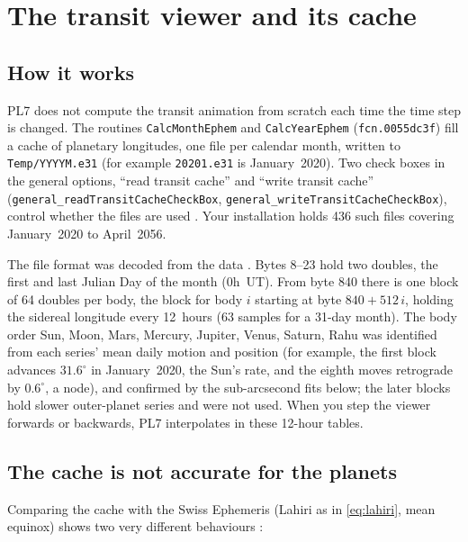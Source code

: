 \section{The transit viewer and its cache}
\label{sec:transit}

\subsection{How it works}

PL7 does not compute the transit animation from scratch each time the time step is
changed. The routines \texttt{CalcMonthEphem} and \texttt{CalcYearEphem}
(\texttt{fcn.0055dc3f}) fill a cache of planetary longitudes, one file per calendar month,
written to \texttt{Temp/YYYYM.e31} (for example \texttt{20201.e31} is January~2020). Two
check boxes in the general options, ``read transit cache'' and ``write transit cache''
(\texttt{general\_readTransitCacheCheckBox}, \texttt{general\_writeTransitCacheCheckBox}),
control whether the files are used \tagBIN. Your installation holds 436 such files covering
January~2020 to April~2056.

The file format was decoded from the data \tagNUM. Bytes 8--23 hold two doubles, the first
and last Julian Day of the month (0h~UT). From byte 840 there is one block of 64 doubles
per body, the block for body $i$ starting at byte $840 + 512\,i$, holding the sidereal
longitude every 12~hours (63 samples for a 31-day month). The body order
Sun, Moon, Mars, Mercury, Jupiter, Venus, Saturn, Rahu was identified from each series'
mean daily motion and position (for example, the first block advances $31.6^\circ$ in
January~2020, the Sun's rate, and the eighth moves retrograde by $0.6^\circ$, a node), and
confirmed by the sub-arcsecond fits below; the later blocks hold slower outer-planet series
and were not used. When you step the viewer forwards or backwards, PL7 interpolates in these
12-hour tables.

\subsection{The cache is not accurate for the planets}
\label{sec:moonvector}

Comparing the cache with the Swiss Ephemeris (Lahiri as in \autoref{eq:lahiri}, mean
equinox) shows two very different behaviours \tagNUM:

